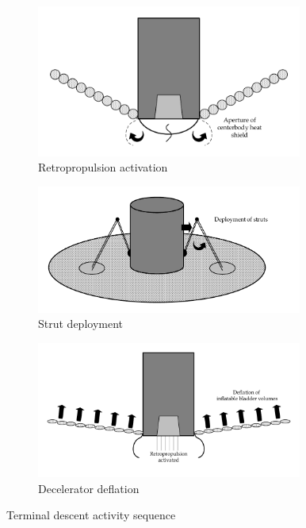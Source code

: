\begin{figure}[h]
	\centering
	\begin{subfigure}[b]{0.44\textwidth}
		\includegraphics[width=0.96\textwidth]{./Figure/CrewModule/TDa.pdf}
		\caption{Retropropulsion activation}
		\label{fig:rot}
	\end{subfigure}
		\begin{subfigure}[b]{0.55\textwidth}
		\centering
			\includegraphics[width=0.96\textwidth]{./Figure/CrewModule/TDc.pdf}
			\caption{Strut deployment}
			\label{fig:hinge}
		\end{subfigure}
	\begin{subfigure}[b]{0.54\textwidth}
		\includegraphics[width=0.96\textwidth]{./Figure/CrewModule/TDb.pdf}
		\vspace{-4.5mm}
		\caption{Decelerator deflation}
		\label{fig:fold}
	\end{subfigure}
		\caption{Terminal descent activity sequence}
	\label{fig:tdseq}
\end{figure}



